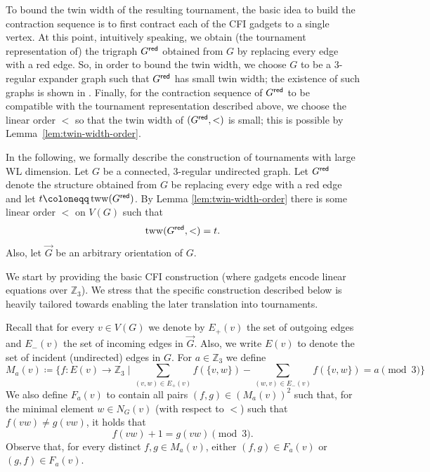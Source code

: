 \PassOptionsToPackage{dvipsnames,svgnames}{xcolor}\documentclass[10pt,a4paper]{article}
\newcommand{\ZZ}{{\mathbb Z}}
\newcommand{\Bigmid}{\;\Big|\;}
\newcommand{\red}{{\sf red}}
\DeclareMathOperator{\tww}{tww}
\begin{document}
To bound the twin width of the resulting tournament, the basic idea to build the contraction sequence is to first contract each of the CFI gadgets to a single vertex.
At this point, intuitively speaking, we obtain (the tournament representation of) the trigraph $G^{\red}$ obtained from $G$ by replacing every edge with a red edge.
So, in order to bound the twin width, we choose $G$ to be a $3$-regular expander graph such that $G^{\red}$ has small twin width; the existence of such graphs is shown in \cite{BonnetGKTW22}.
Finally, for the contraction sequence of $G^{\red}$ to be compatible with the tournament representation described above, we choose the linear order $<$ so that the twin width of $(G^{\red},<)$ is small; this is possible by Lemma~\ref{lem:twin-width-order}.

In the following, we formally describe the construction of tournaments with large WL dimension.
Let $G$ be a connected, $3$-regular undirected graph.
Let $G^{\red}$ denote the structure obtained from $G$ be replacing every edge with a red edge and let $t \coloneqq \tww(G^{\red})$.
By Lemma \ref{lem:twin-width-order} there is some linear order $<$ on $V(G)$ such that
\begin{equation}
 \label{eq:order-twin-width}
 \tww(G^\red,<) = t.
\end{equation}
Also, let $\vec{G}$ be an arbitrary orientation of $G$.

We start by providing the basic CFI construction (where gadgets encode linear equations over $\ZZ_3$).
We stress that the specific construction described below is heavily tailored towards enabling the later translation into tournaments.

Recall that for every $v \in V(G)$ we denote by $E_+(v)$ the set of outgoing edges and $E_-(v)$ the set of incoming edges in $\vec{G}$.
Also, we write $E(v)$ to denote the set of incident (undirected) edges in $G$.
For $a \in \ZZ_3$ we define
\[M_a(v) \coloneqq \Big\{f\colon E(v) \to \ZZ_3 \Bigmid \sum_{(v,w) \in E_+(v)} f(\{v,w\}) - \sum_{(w,v) \in E_-(v)} f(\{v,w\}) = a \pmod{3}\Big\}\]
We also define $F_a(v)$ to contain all pairs $(f,g) \in (M_a(v))^2$ such that, for the minimal element $w \in N_G(v)$ (with respect to $<$) such that $f(vw) \neq g(vw)$, it holds that
\[f(vw) + 1 = g(vw) \pmod{3}.\]
Observe that, for every distinct $f,g \in M_a(v)$, either $(f,g) \in F_a(v)$ or $(g,f) \in F_a(v)$.
\end{document}
